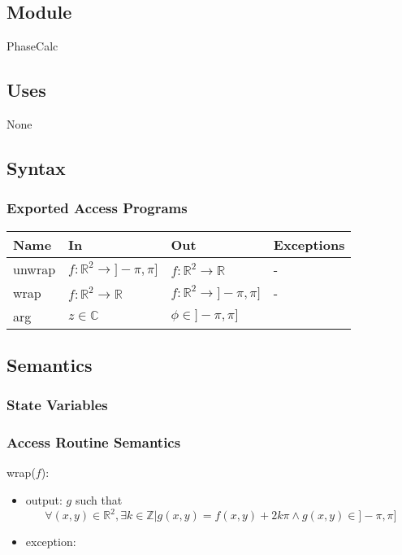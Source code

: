 \documentclass[12pt, titlepage]{article}
\begin{document}
\subsection{Module}
PhaseCalc
\subsection{Uses}
None
\subsection{Syntax}

\subsubsection{Exported Access Programs}

\begin{center}
\begin{tabular}{p{2cm} p{4cm} p{4cm} p{2cm}}
\hline
\textbf{Name} & \textbf{In} & \textbf{Out} & \textbf{Exceptions} \\
\hline
unwrap & $f:\mathbb{R}^2\rightarrow]-\pi,\pi]$ & $f:\mathbb{R}^2\rightarrow\mathbb{R}$ & - \\
wrap & $f:\mathbb{R}^2\rightarrow\mathbb{R}$ & $f:\mathbb{R}^2\rightarrow]-\pi,\pi]$ & - \\
arg & $z \in \mathbb{C}$ & $\phi \in ]-\pi,\pi]$ & \\
\hline
\end{tabular}
\end{center}

\subsection{Semantics}

\subsubsection{State Variables}


\subsubsection{Access Routine Semantics}

\noindent wrap($f$):
\begin{itemize} 
\item output: $g$ such that
\begin{equation*}
\forall (x,y) \in \mathbb{R}^2, \exists k \in \mathbb{Z} | g(x,y) =f(x,y)+ 2k\pi \wedge g(x,y) \in ]-\pi,\pi]
\end{equation*} 
\item exception:
\end{itemize}
\end{document}
